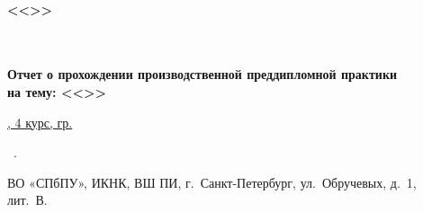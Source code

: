 \renewcommand{\SupervisorFull}{Сергеев Анатолий Васильевич}
\renewcommand{\Supervisor}{А.В.\,Сергеев}
\renewcommand{\SupervisorDegree}{к.т.н, доцент ВШ ПИ}
\renewcommand{\ConsultantExtraFull}{нет}
\renewcommand{\ConsultantExtra}{нет}
\renewcommand{\ConsultantExtraDegree}{}
\renewcommand{\PracticeStartDate}{04.05.2026}
\renewcommand{\PracticeEndDate}{18.05.2026}
\renewcommand{\Workplace}{ФГАОУ ВО «СПбПУ», ИКНК, ВШ ПИ, г.~Санкт-Петербург, ул.~Обручевых, д.~1, лит.~В}
\thispagestyle{empty}%
\makeatletter
{}
%
\makeatother

{\centering%
\small%
\MakeUppercase{\SPbPUOfficialPrefix}\\
{\bfseries %
  <<\MakeUppercase{\SPbPU}>>\\%
\MakeUppercase{\institute}\\
\MakeUppercase{\School}\\
}
\par}%


\vspace{0pt plus1fill} %


\noindent




{\centering%
{\bfseries{}
Отчет о прохождении производственной преддипломной практики\\
на тему: <<\practiceTitle>>}\\

\intervalS\normalfont%

\uline{\AuthorFullVin , 4 курс, гр. \group}%

\intervalS\normalfont%

\par}%

\intervalS %


{ {\expandafter \ulined \thesisSpecialtyCode~\thesisSpecialtyTitle}.}\par


{ {\expandafter \ulined \Workplace}.} %


